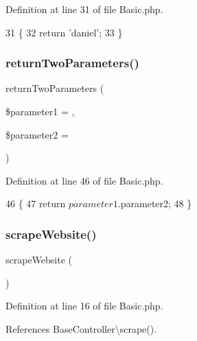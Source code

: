 Definition at line 31 of file Basic.\+php.


\begin{DoxyCode}
31                                    \{
32         \textcolor{keywordflow}{return} \textcolor{stringliteral}{'daniel'};
33     \}
\end{DoxyCode}
\hypertarget{class_basic_a2ef87b96abcca966a41e34d077fcc38e}{}\label{class_basic_a2ef87b96abcca966a41e34d077fcc38e} 
\subsubsection{\texorpdfstring{return\+Two\+Parameters()}{returnTwoParameters()}}
{\footnotesize\ttfamily return\+Two\+Parameters (\begin{DoxyParamCaption}\item[{}]{\$parameter1 = {\ttfamily \textquotesingle{}\textquotesingle{}},  }\item[{}]{\$parameter2 = {\ttfamily \textquotesingle{}\textquotesingle{}} }\end{DoxyParamCaption})}



Definition at line 46 of file Basic.\+php.


\begin{DoxyCode}
46                                                                             \{
47         \textcolor{keywordflow}{return} $parameter1 . $parameter2;
48     \}
\end{DoxyCode}
\hypertarget{class_basic_a48ffe9a27b91ce968b2bcf5e0a9d4069}{}\label{class_basic_a48ffe9a27b91ce968b2bcf5e0a9d4069} 
\subsubsection{\texorpdfstring{scrape\+Website()}{scrapeWebsite()}}
{\footnotesize\ttfamily scrape\+Website (\begin{DoxyParamCaption}{ }\end{DoxyParamCaption})}



Definition at line 16 of file Basic.\+php.



References Base\+Controller\textbackslash{}scrape().


